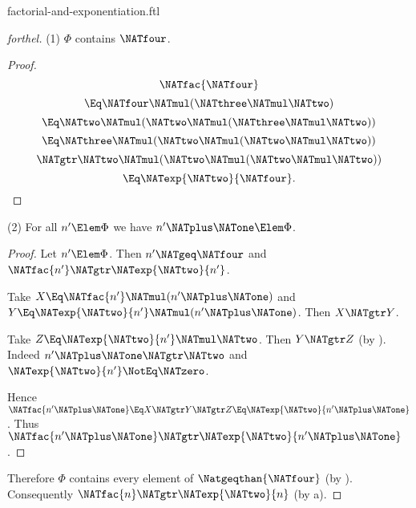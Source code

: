 \documentclass{stex}
\begin{document}
\begin{smodule}{factorial-and-exponentiation.ftl}
\begin{proof}[forthel]
  (1) $\Phi$ contains $\NATfour$.
  \begin{proof}
    \[  \NATfac{\NATfour}                                  \]
    \[    \Eq \NATfour \NATmul (\NATthree \NATmul \NATtwo)             \]
    \[    \Eq \NATtwo \NATmul (\NATtwo \NATmul (\NATthree \NATmul \NATtwo))   \]
    \[    \Eq \NATthree \NATmul (\NATtwo \NATmul (\NATtwo \NATmul \NATtwo))   \]
    \[    \NATgtr \NATtwo \NATmul (\NATtwo \NATmul (\NATtwo \NATmul \NATtwo))   \]
    \[    \Eq \NATexp{\NATtwo}{\NATfour}.                          \]
  \end{proof}

  (2) For all $n' \Elem \Phi$ we have $n' \NATplus \NATone \Elem \Phi$.
  \begin{proof}
    Let $n' \Elem \Phi$.
    Then $n' \NATgeq \NATfour$ and $\NATfac{n'} \NATgtr \NATexp{\NATtwo}{n'}$.

    Take $X \Eq \NATfac{n'} \NATmul (n' \NATplus \NATone)$ and $Y \Eq \NATexp{\NATtwo}{n'} \NATmul (n' \NATplus \NATone)$.
    Then $X \NATgtr Y$.

    Take $Z \Eq \NATexp{\NATtwo}{n'} \NATmul \NATtwo$.
    Then $Y \NATgtr Z$ (by ).
    Indeed $n' \NATplus \NATone \NATgtr \NATtwo$ and $\NATexp{\NATtwo}{n'} \NotEq \NATzero$.

    Hence $\NATfac{n' \NATplus \NATone} \Eq X \NATgtr Y \NATgtr Z \Eq \NATexp{\NATtwo}{n' \NATplus \NATone}$.
    Thus $\NATfac{n' \NATplus \NATone} \NATgtr \NATexp{\NATtwo}{n' \NATplus \NATone}$.
  \end{proof}

  Therefore $\Phi$ contains every element of $\Natgeqthan{\NATfour}$ (by ).
  Consequently $\NATfac{n} \NATgtr \NATexp{\NATtwo}{n}$ (by a).
\end{proof}
\end{smodule}
\end{document}
